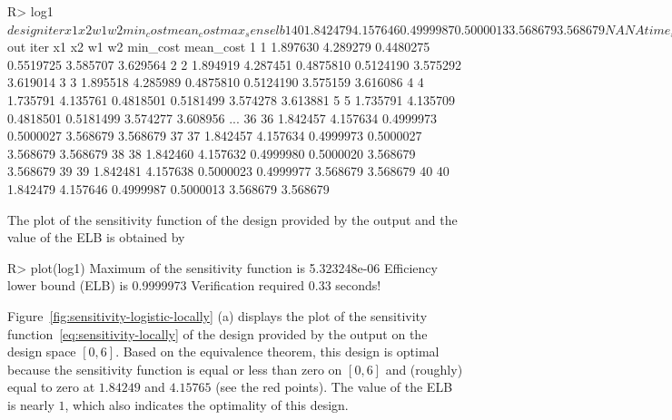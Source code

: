 \begin{example}
R> log1$design
iter       x1       x2        w1        w2 min_cost mean_cost max_sens elb
1   40 1.842479 4.157646 0.4999987 0.5000013 3.568679  3.568679       NA  NA
time_sec
1       NA
R> log1$out
iter       x1       x2        w1        w2 min_cost mean_cost
1     1 1.897630 4.289279 0.4480275 0.5519725 3.585707  3.629564
2     2 1.894919 4.287451 0.4875810 0.5124190 3.575292  3.619014
3     3 1.895518 4.285989 0.4875810 0.5124190 3.575159  3.616086
4     4 1.735791 4.135761 0.4818501 0.5181499 3.574278  3.613881
5     5 1.735791 4.135709 0.4818501 0.5181499 3.574277  3.608956
...
36   36 1.842457 4.157634 0.4999973 0.5000027 3.568679  3.568679
37   37 1.842457 4.157634 0.4999973 0.5000027 3.568679  3.568679
38   38 1.842460 4.157632 0.4999980 0.5000020 3.568679  3.568679
39   39 1.842481 4.157638 0.5000023 0.4999977 3.568679  3.568679
40   40 1.842479 4.157646 0.4999987 0.5000013 3.568679  3.568679
\end{example}
The plot of the sensitivity function of the design provided by the output and the value of the ELB is obtained by
\begin{example}
R> plot(log1)
Maximum of the sensitivity function is  5.323248e-06
Efficiency lower bound (ELB) is  0.9999973
Verification required 0.33 seconds!
  \end{example}
Figure~\ref{fig:sensitivity-logistic-locally} (a) displays the plot of the sensitivity function~\eqref{eq:sensitivity-locally}  of  the design provided by the output on the design space $[0,6]$. Based on the equivalence theorem, this design is optimal because  the sensitivity function is equal or less than zero on $[0,6]$ and (roughly) equal to zero at  $1.84249$ and $4.15765$  (see the red points).  The value of the ELB is nearly $1$, which also indicates the optimality of this design.
